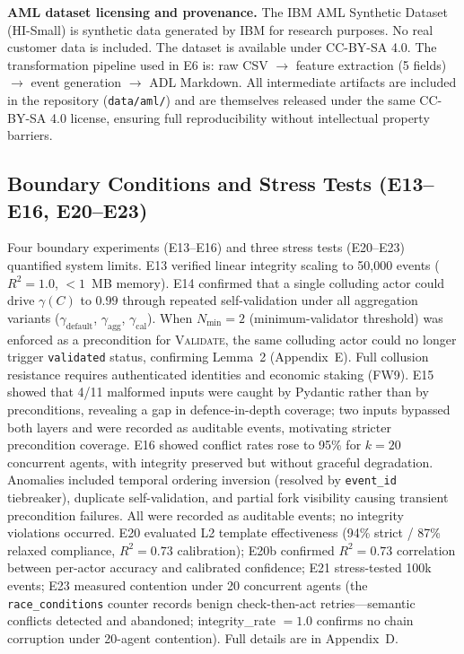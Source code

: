\textbf{AML dataset licensing and provenance.} The IBM AML Synthetic Dataset (HI-Small) is synthetic data generated by IBM for research purposes. No real customer data is included. The dataset is available under CC-BY-SA 4.0. The transformation pipeline used in E6 is: raw CSV $\rightarrow$ feature extraction (5 fields) $\rightarrow$ event generation $\rightarrow$ ADL Markdown. All intermediate artifacts are included in the repository (\texttt{data/aml/}) and are themselves released under the same CC-BY-SA 4.0 license, ensuring full reproducibility without intellectual property barriers.

\subsection{Boundary Conditions and Stress Tests (E13--E16, E20--E23)}\label{subsec:boundary-experiments}

Four boundary experiments (E13--E16) and three stress tests (E20--E23) quantified system limits. E13 verified linear integrity scaling to 50,000 events ($R^2 = 1.0$, $<1$~MB memory). E14 confirmed that a single colluding actor could drive $\gamma(C)$ to $0.99$ through repeated self-validation under all aggregation variants ($\gamma_{\text{default}}$, $\gamma_{\text{agg}}$, $\gamma_{\text{cal}}$). When $N_{\min} = 2$ (minimum-validator threshold) was enforced as a precondition for \textsc{Validate}, the same colluding actor could no longer trigger \texttt{validated} status, confirming Lemma~2 (Appendix~E). Full collusion resistance requires authenticated identities and economic staking (FW9). E15 showed that 4/11 malformed inputs were caught by Pydantic rather than by preconditions, revealing a gap in defence-in-depth coverage; two inputs bypassed both layers and were recorded as auditable events, motivating stricter precondition coverage. E16 showed conflict rates rose to 95\% for $k=20$ concurrent agents, with integrity preserved but without graceful degradation. Anomalies included temporal ordering inversion (resolved by \texttt{event\_id} tiebreaker), duplicate self-validation, and partial fork visibility causing transient precondition failures. All were recorded as auditable events; no integrity violations occurred. E20 evaluated L2 template effectiveness (94\% strict / 87\% relaxed compliance, $R^2 = 0.73$ calibration); E20b confirmed $R^2 = 0.73$ correlation between per-actor accuracy and calibrated confidence; E21 stress-tested 100k events; E23 measured contention under 20 concurrent agents (the \texttt{race\_conditions} counter records benign check-then-act retries---semantic conflicts detected and abandoned; integrity\_rate $= 1.0$ confirms no chain corruption under 20-agent contention). Full details are in Appendix~D.


